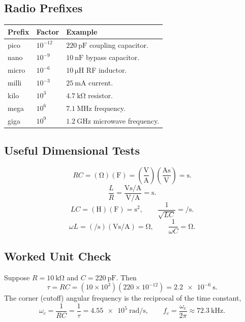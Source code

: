 \subsection{Radio Prefixes}
\begin{tabularx}{\textwidth}{@{}L{0.2\textwidth}L{0.2\textwidth}Y@{}}
\toprule
Prefix & Factor & Example \\
\midrule
pico & \(10^{-12}\) & \(\SI{220}{\pico\farad}\) coupling capacitor. \\
nano & \(10^{-9}\) & \(\SI{10}{\nano\farad}\) bypass capacitor. \\
micro & \(10^{-6}\) & \(\SI{10}{\micro\henry}\) RF inductor. \\
milli & \(10^{-3}\) & \(\SI{25}{\milli\ampere}\) current. \\
kilo & \(10^{3}\) & \(\SI{4.7}{\kilo\ohm}\) resistor. \\
mega & \(10^{6}\) & \(\SI{7.1}{\mega\hertz}\) frequency. \\
giga & \(10^{9}\) & \(\SI{1.2}{\giga\hertz}\) microwave frequency. \\
\bottomrule
\end{tabularx}

\subsection{Useful Dimensional Tests}
\begin{unitsbox}
\[
RC=(\si{\ohm})(\si{\farad})
=\left(\frac{\si{\volt}}{\si{\ampere}}\right)
\left(\frac{\si{\ampere\second}}{\si{\volt}}\right)
=\si{\second}.
\]
\[
\frac{L}{R}
=\frac{\si{\volt\second\per\ampere}}{\si{\volt\per\ampere}}
=\si{\second}.
\]
\[
LC=(\si{\henry})(\si{\farad})=\si{\second\squared},
\qquad
\frac{1}{\sqrt{LC}}=\si{\per\second}.
\]
\[
\omega L=(\si{\per\second})(\si{\volt\second\per\ampere})
=\si{\ohm},
\qquad
\frac{1}{\omega C}=\si{\ohm}.
\]
\end{unitsbox}

\subsection{Worked Unit Check}
Suppose \(R=\SI{10}{\kilo\ohm}\) and \(C=\SI{220}{\pico\farad}\). Then
\[
\tau=RC=(10\times10^3)(220\times10^{-12})=\SI{2.2e-6}{\second}.
\]
The corner (cutoff) angular frequency is the reciprocal of the time constant,
\[
\omega_c=\frac{1}{RC}=\frac{1}{\tau}=\SI{4.55e5}{\radian\per\second},
\qquad
f_c=\frac{\omega_c}{2\pi}\approx \SI{72.3}{\kilo\hertz}.
\]

